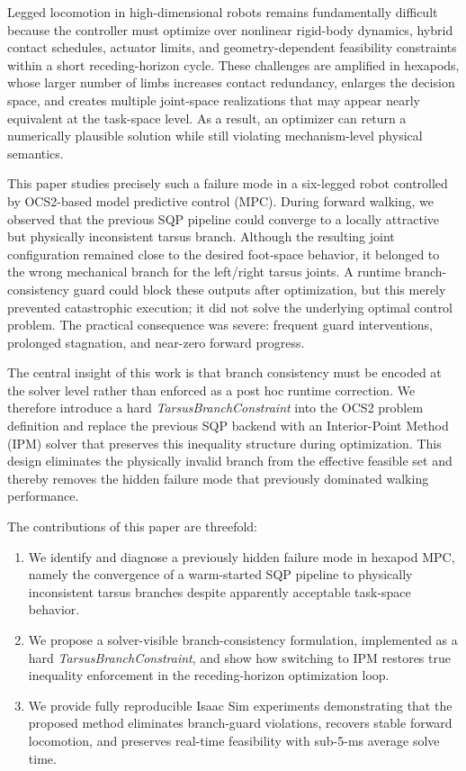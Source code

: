 Legged locomotion in high-dimensional robots remains fundamentally difficult because the controller must optimize over nonlinear rigid-body dynamics, hybrid contact schedules, actuator limits, and geometry-dependent feasibility constraints within a short receding-horizon cycle. These challenges are amplified in hexapods, whose larger number of limbs increases contact redundancy, enlarges the decision space, and creates multiple joint-space realizations that may appear nearly equivalent at the task-space level. As a result, an optimizer can return a numerically plausible solution while still violating mechanism-level physical semantics.

This paper studies precisely such a failure mode in a six-legged robot controlled by OCS2-based model predictive control (MPC). During forward walking, we observed that the previous SQP pipeline could converge to a locally attractive but physically inconsistent tarsus branch. Although the resulting joint configuration remained close to the desired foot-space behavior, it belonged to the wrong mechanical branch for the left/right tarsus joints. A runtime branch-consistency guard could block these outputs after optimization, but this merely prevented catastrophic execution; it did not solve the underlying optimal control problem. The practical consequence was severe: frequent guard interventions, prolonged stagnation, and near-zero forward progress.

The central insight of this work is that branch consistency must be encoded at the solver level rather than enforced as a post hoc runtime correction. We therefore introduce a hard \emph{TarsusBranchConstraint} into the OCS2 problem definition and replace the previous SQP backend with an Interior-Point Method (IPM) solver that preserves this inequality structure during optimization. This design eliminates the physically invalid branch from the effective feasible set and thereby removes the hidden failure mode that previously dominated walking performance.

The contributions of this paper are threefold:
\begin{enumerate}
    \item We identify and diagnose a previously hidden failure mode in hexapod MPC, namely the convergence of a warm-started SQP pipeline to physically inconsistent tarsus branches despite apparently acceptable task-space behavior.
    \item We propose a solver-visible branch-consistency formulation, implemented as a hard \emph{TarsusBranchConstraint}, and show how switching to IPM restores true inequality enforcement in the receding-horizon optimization loop.
    \item We provide fully reproducible Isaac Sim experiments demonstrating that the proposed method eliminates branch-guard violations, recovers stable forward locomotion, and preserves real-time feasibility with sub-5-ms average solve time.
\end{enumerate}

